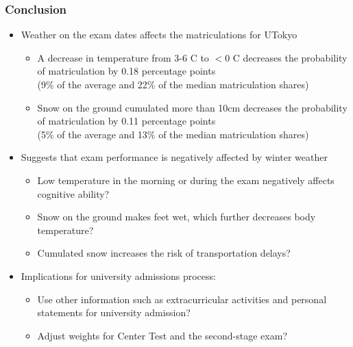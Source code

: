 \documentclass[10pt, pdfmx,hiresbb]{beamer}
\begin{document}
\begin{frame}
  \frametitle{Conclusion}
  \begin{itemize}
    \item Weather on the exam dates affects the matriculations for UTokyo
      \begin{itemize}
        \item A decrease in temperature from 3-6 \degree C to $<$0 \degree C decreases the probability of matriculation by 0.18 percentage points \\
          (9\% of the average and 22\% of the median matriculation shares)
        \item Snow on the ground cumulated more than 10cm decreases the probability of matriculation by 0.11 percentage points \\
          (5\% of the average and 13\% of the median matriculation shares)
      \end{itemize}
    \item Suggests that exam performance is negatively affected by winter weather
      \begin{itemize}
        \item Low temperature in the morning or during the exam negatively affects cognitive ability?
        \item Snow on the ground makes feet wet, which further decreases body temperature?
        \item Cumulated snow increases the risk of transportation delays?
      \end{itemize}
    \item Implications for university admissions process:
      \begin{itemize}
        \item Use other information such as extracurricular activities and personal statements for university admission?
        \item Adjust weights for Center Test and the second-stage exam?
      \end{itemize}
  \end{itemize}
\end{frame}

\appendix
\end{document}
